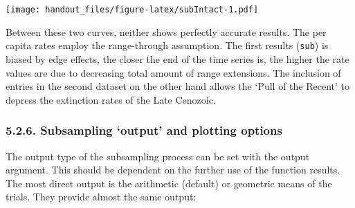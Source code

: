 \documentclass[]{article}
\begin{document}
\texttt{[image: handout\_files/figure-latex/subIntact-1.pdf]}

Between these two curves, neither shows perfectly accurate results. The
per capita rates employ the range-through assumption. The first results
(\texttt{sub}) is biased by edge effects, the closer the end of the time
series is, the higher the rate values are due to decreasing total amount
of range extensions. The inclusion of entries in the second dataset on
the other hand allows the `Pull of the Recent' to depress the extinction
rates of the Late Cenozoic.

\subsubsection{\texorpdfstring{5.2.6. Subsampling `output' and plotting
options}{5.2.6. Subsampling output and plotting options}}\label{subsampling-output-and-plotting-options}

The output type of the subsampling process can be set with the output
argument. This should be dependent on the further use of the function
results. The most direct output is the arithmetic (default) or geometric
means of the trials. They provide almost the same output:
\end{document}
